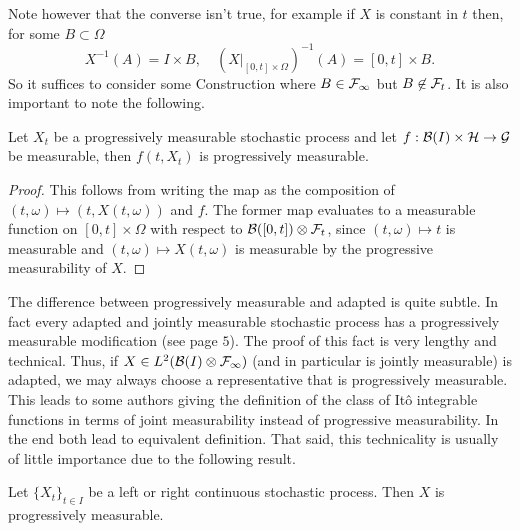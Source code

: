 \documentclass[
    a4paper,
    DIV=14,
    abstract=true,
    numbers=noenddot
]{scrartcl}
\begin{document}
Note however that the converse isn't true, for example if $X$ is constant in $t$ then, for some $B\subset \Omega$
\begin{equation*}
	X^{-1}(A)=I\times B, \quad (X|_{[0,t]\times\Omega})^{-1}(A)= [0,t]\times B.
\end{equation*}
So it suffices to consider some Construction where $B\in\mathcal{F}_\infty$ but $B\not\in\mathcal{F}_t$.
It is also important to note the following.
\begin{lemma}
	Let $X_t$ be a  progressively measurable stochastic process and let $f:\mathcal{B}(I)\times\mathcal{H}\to\mathcal{G}$ be measurable, then $f(t,X_t)$ is progressively measurable.
\end{lemma}
\begin{proof}
	This follows from writing the map as the composition of $(t,\omega)\mapsto (t,X(t,\omega))$ and $f$. The former map evaluates to a measurable function on $[0,t]\times\Omega$ with respect to $\mathcal{B}([0,t])\otimes\mathcal{F}_t$, since $(t,\omega)\mapsto t$ is measurable and $(t,\omega)\mapsto X(t,\omega)$ is measurable by the progressive measurability of $X$.
\end{proof}
The difference between progressively measurable and adapted is quite subtle. In fact every adapted and jointly measurable stochastic process has a progressively measurable modification (see \cite{Karatzas1987BrownianMA} page $5$). The proof of this fact is very lengthy and technical. Thus, if $X\in L^2(\mathcal{B}(I)\otimes\mathcal{F}_\infty)$ (and in particular is jointly measurable) is adapted, we may always choose a representative that is progressively measurable. This leads to some authors giving the definition of the class of Itô integrable functions in terms of joint measurability instead of progressive measurability. In the end both lead to equivalent definition. That said, this technicality is usually of little importance due to the following result.
\begin{lemma}
	Let $\{X_t\}_{t\in I}$ be a left or right continuous stochastic process. Then $X$ is progressively measurable.
\end{lemma}
\end{document}
